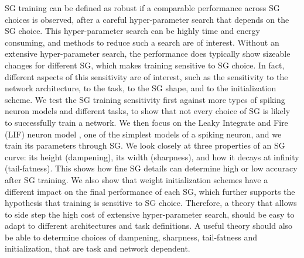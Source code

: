 SG training can be defined as robust
if a comparable performance across SG choices is observed, after a careful hyper-parameter search that depends on the SG choice.
This hyper-parameter search can be highly time and energy consuming, and methods to reduce such a search are of interest. 
Without an extensive hyper-parameter search, the performance does typically show sizeable changes for different SG, which makes training sensitive to SG choice.
In fact, different aspects of this sensitivity are of interest, such as the sensitivity to the network architecture, to the task, to the SG shape, and to the initialization scheme. 
We test the SG training sensitivity first against more types of spiking neuron models and different tasks, to show that not every choice of SG is likely to successfully train a network. 
We then focus on the Leaky Integrate and Fire (LIF) neuron model \cite{lapique1907recherches}, one of the simplest models of a spiking neuron, and we train its parameters through SG.
We look closely at three properties of an SG curve: its height (dampening), its width (sharpness), and how it decays at infinity (tail-fatness). This shows how  fine SG details can determine high or low accuracy after SG training.
We also show that weight initialization schemes have a different impact on the final performance of each SG, which further supports the hypothesis that training is sensitive to SG choice. Therefore, a theory that allows to side step the high cost of extensive hyper-parameter search, should be easy to adapt to different architectures and task definitions. A useful theory should also be able to determine choices of dampening, sharpness, tail-fatness and initialization, that are task and network dependent.


